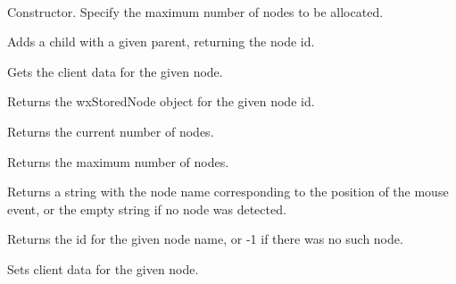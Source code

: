 
\\






Constructor. Specify the maximum number of nodes to be allocated.

\label{wxtreelayoutstoredaddchild}


Adds a child with a given parent, returning the node id.

\label{wxtreelayoutstoredgetclientdata}


Gets the client data for the given node.

\label{wxtreelayoutstoredgetnode}


Returns the wxStoredNode object for the given node id.

\label{wxtreelayoutstoredgetnodecount}


Returns the current number of nodes.

\label{wxtreelayoutstoredgetnumnodes}


Returns the maximum number of nodes.

\label{wxtreelayoutstoredhittest}


Returns a string with the node name corresponding to the position of the mouse event, or the empty string if no node
was detected.

\label{wxtreelayoutstorednametoid}


Returns the id for the given node name, or -1 if there was no such node.

\label{wxtreelayoutstoredsetclientdata}


Sets client data for the given node.


